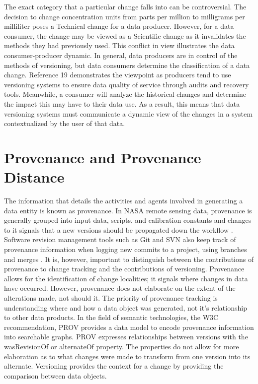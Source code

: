 The exact category that a particular change falls into can be controversial.
The decision to change concentration units from parts per million to milligrams per milliliter poses a Technical change for a data producer.
However, for a data consumer, the change may be viewed as a Scientific change as it invalidates the methods they had previously used.
This conflict in view illustrates the data consumer-producer dynamic.
In general, data producers are in control of the methods of versioning, but data consumers determine the classification of a data change.
Reference 19 demonstrates the viewpoint as producers tend to use versioning systems to ensure data quality of service through audits and recovery tools.
Meanwhile, a consumer will analyze the historical changes and determine the impact this may have to their data use.
As a result, this means that data versioning systems must communicate a dynamic view of the changes in a system contextualized by the user of that data.

\section{Provenance and Provenance Distance}

The information that details the activities and agents involved in generating a data entity is known as provenance.
In NASA remote sensing data, provenance is generally grouped into input data, scripts, and calibration constants and changes to it signals that a new versions should be propagated down the workflow \cite{Barkstrom2003}.
Software revision management tools such as Git and SVN also keep track of provenance information when logging new commits to a project, using branches and merges  \cite{Chacon:2009:PG:1618548}.
It is, however, important to distinguish between the contributions of provenance to change tracking and the contributions of versioning.
Provenance allows for the identification of change localities; it signals where changes in data have occurred.
However, provenance does not elaborate on the extent of the alterations made, not should it.
The priority of provenance tracking is understanding where and how a data object was generated, not it's relationship to other data products.
In the field of semantic technologies, the W3C recommendation, PROV provides a data model to encode provenance information into searchable graphs.
PROV expresses relationships between versions with the wasRevisionOf or alternateOf property.
The properties do not allow for more elaboration as to what changes were made to transform from one version into its alternate.
Versioning provides the context for a change by providing the comparison between data objects.

